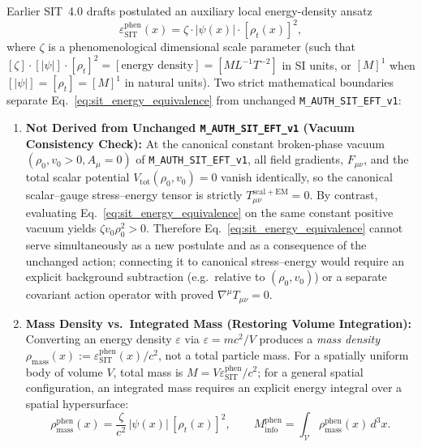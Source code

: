Earlier SIT~4.0 drafts postulated an auxiliary local energy-density ansatz
\begin{equation}
    \varepsilon_{\text{SIT}}^{\mathrm{phen}}(x) = \zeta \cdot |\psi(x)| \cdot [\rho_t(x)]^2,
    \label{eq:sit_energy_equivalence}
\end{equation}
where $\zeta$ is a phenomenological dimensional scale parameter (such that $[\zeta]\cdot[|\psi|]\cdot[\rho_t]^2 = [\text{energy density}] = [M L^{-1} T^{-2}]$ in SI units, or $[M]^1$ when $[|\psi|] = [\rho_t] = [M]^1$ in natural units). Two strict mathematical boundaries separate Eq.~\eqref{eq:sit_energy_equivalence} from unchanged \texttt{M\_AUTH\_SIT\_EFT\_v1}:
\begin{enumerate}[leftmargin=2em]
  \item \textbf{Not Derived from Unchanged \texttt{M\_AUTH\_SIT\_EFT\_v1} (Vacuum Consistency Check):} At the canonical constant broken-phase vacuum $(\rho_0, v_0 > 0, A_\mu = 0)$ of \texttt{M\_AUTH\_SIT\_EFT\_v1}, all field gradients, $F_{\mu\nu}$, and the total scalar potential $V_{\mathrm{tot}}(\rho_0, v_0) = 0$ vanish identically, so the canonical scalar--gauge stress--energy tensor is strictly $T_{\mu\nu}^{\mathrm{scal+EM}} = 0$. By contrast, evaluating Eq.~\eqref{eq:sit_energy_equivalence} on the same constant positive vacuum yields $\zeta v_0 \rho_0^2 > 0$. Therefore Eq.~\eqref{eq:sit_energy_equivalence} cannot serve simultaneously as a new postulate and as a consequence of the unchanged action; connecting it to canonical stress--energy would require an explicit background subtraction (e.g.\ relative to $(\rho_0, v_0)$) or a separate covariant action operator with proved $\nabla^\mu T_{\mu\nu} = 0$.
  \item \textbf{Mass Density vs.\ Integrated Mass (Restoring Volume Integration):} Converting an energy density $\varepsilon$ via $\varepsilon = m c^2 / V$ produces a \emph{mass density} $\rho_{\mathrm{mass}}(x) := \varepsilon_{\mathrm{SIT}}^{\mathrm{phen}}(x)/c^2$, not a total particle mass. For a spatially uniform body of volume $V$, total mass is $M = V \varepsilon_{\mathrm{SIT}}^{\mathrm{phen}} / c^2$; for a general spatial configuration, an integrated mass requires an explicit energy integral over a spatial hypersurface:
  \begin{equation}
      \rho_{\mathrm{mass}}^{\mathrm{phen}}(x) = \frac{\zeta}{c^2}\,|\psi(x)|\,[\rho_t(x)]^2,
      \qquad
      M_{\mathrm{info}}^{\mathrm{phen}} = \int_{\mathcal{V}} \rho_{\mathrm{mass}}^{\mathrm{phen}}(x)\,d^3x.
      \label{eq:mass_from_sit}
  \end{equation}
\end{enumerate}


